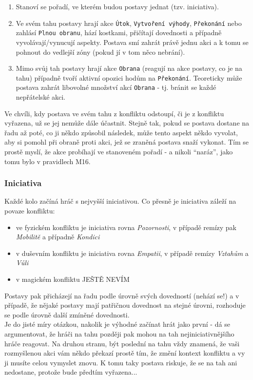 \begin{enumerate}
\item Stanoví se pořadí, ve kterém budou postavy jednat (tzv. iniciativa).
\item Ve svém tahu postavy hrají akce \texttt{Útok}, \texttt{Vytvoření výhody}, \texttt{Překonání} nebo zahlásí \texttt{Plnou obranu}, hází kostkami, přičítají dovednosti a případně vyvolávají/vynucují aspekty. Postava smí zahrát právě jednu akci a k tomu se pohnout do vedlejší zóny (pokud jí v tom něco nebrání).
\item Mimo svůj tah postavy hrají akce \texttt{Obrana} (reagují na akce postavy, co je na tahu) případně tvoří aktivní opozici hodům na \texttt{Překonání}. Teoreticky může postava zahrát libovolné množství akcí \texttt{Obrana} - tj. bránit se každé nepřátelské akci.
\end{enumerate}

Ve chvíli, kdy postava ve svém tahu z konfliktu odstoupí, či je z konfliktu vyřazena, už se jej nemůže dále účastnit. Stejně tak, pokud se postava dostane na řadu až poté, co ji někdo způsobil následek, může tento aspekt někdo vyvolat, aby si pomohl při obraně proti akci, jež se zraněná postava snaží vykonat. Tím se prostě myslí, že akce probíhají ve stanoveném pořadí - a nikoli ``naráz'', jako tomu bylo v pravidlech M16.

\subsubsection{Iniciativa}
\label{sec:iniciativa}

Každé kolo začíná hráč s nejvyšší iniciativou. Co přesně je iniciativa záleží na povaze konfliktu:

\begin{itemize}
\item ve fyzickém konfliktu je iniciativa rovna \textit{Pozornosti}, v případě remízy pak \textit{Mobilitě} a případně \textit{Kondici}
\item v duševním konfliktu je iniciativa rovna \textit{Empatii}, v případě remízy \textit{Vztahům} a \textit{Vůli}
\item v magickém konfliktu JEŠTĚ NEVÍM
\end{itemize}

Postavy pak přicházejí na řadu podle úrovně svých dovedností (nehází se!) a v případě, že nějaké postavy mají patřičnou dovednost na stejné úrovni, rozhoduje se podle úrovně další zmíněné dovednosti.\\
Je do jisté míry otázkou, nakolik je výhodné začínat hrát jako první - dá se argumentovat, že hráči na tahu později pak mohou na tah nejiniciativnějšího hráče reagovat. Na druhou stranu, být poslední na tahu vždy znamená, že vaši rozmyšlenou akci vám někdo překazí prostě tím, že změní kontext konfliktu a vy ji musíte celou vymyslet znovu. K tomu taky postava riskuje, že se na tah ani nedostane, protože bude předtím vyřazena...

